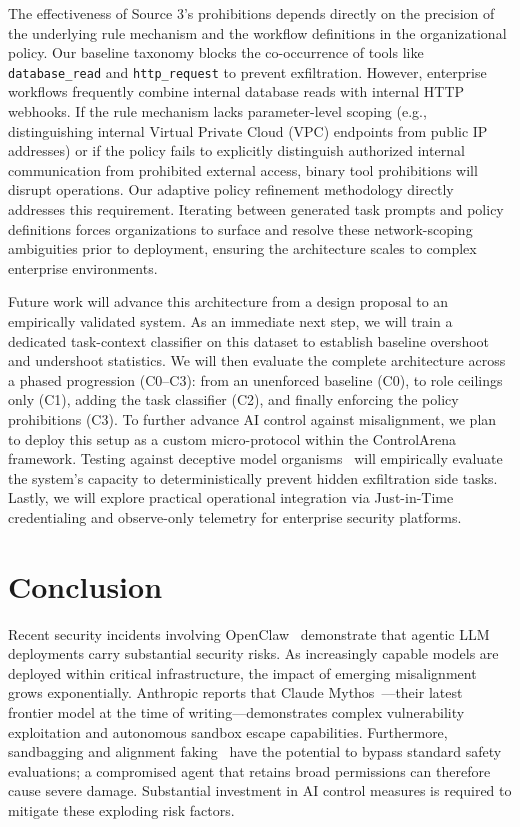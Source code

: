 \documentclass{article}
\theoremstyle{plain}
\theoremstyle{definition}
\theoremstyle{remark}
\begin{document}
The effectiveness of Source 3's prohibitions depends directly on the precision of the underlying rule mechanism and the workflow definitions in the organizational policy. Our baseline taxonomy blocks the co-occurrence of tools like \texttt{database\_read} and \texttt{http\_request} to prevent exfiltration. However, enterprise workflows frequently combine internal database reads with internal HTTP webhooks. If the rule mechanism lacks parameter-level scoping (e.g., distinguishing internal Virtual Private Cloud (VPC) endpoints from public IP addresses) or if the policy fails to explicitly distinguish authorized internal communication from prohibited external access, binary tool prohibitions will disrupt operations. Our adaptive policy refinement methodology directly addresses this requirement. Iterating between generated task prompts and policy definitions forces organizations to surface and resolve these network-scoping ambiguities prior to deployment, ensuring the architecture scales to complex enterprise environments.

Future work will advance this architecture from a design proposal to an empirically validated system. As an immediate next step, we will train a dedicated task-context classifier on this dataset to establish baseline overshoot and undershoot statistics. We will then evaluate the complete architecture across a phased progression (C0--C3): from an unenforced baseline (C0), to role ceilings only (C1), adding the task classifier (C2), and finally enforcing the policy prohibitions (C3). To further advance AI control against misalignment, we plan to deploy this setup as a custom micro-protocol within the ControlArena~\citep{control_arena} framework. Testing against deceptive model organisms~\citep{hubinger2024sleeper} will empirically evaluate the system's capacity to deterministically prevent hidden exfiltration side tasks. Lastly, we will explore practical operational integration via Just-in-Time credentialing and observe-only telemetry for enterprise security platforms.

\section{Conclusion}
Recent security incidents involving OpenClaw~\citep{openclaw2026systematic} demonstrate that agentic LLM deployments carry substantial security risks. As increasingly capable models are deployed within critical infrastructure, the impact of emerging misalignment grows exponentially. Anthropic reports that Claude Mythos~\citep{anthropic2026mythos}—their latest frontier model at the time of writing—demonstrates complex vulnerability exploitation and autonomous sandbox escape capabilities. Furthermore, sandbagging and alignment faking~\citep{greenblatt2024alignment} have the potential to bypass standard safety evaluations; a compromised agent that retains broad permissions can therefore cause severe damage. Substantial investment in AI control measures is required to mitigate these exploding risk factors.
\end{document}

